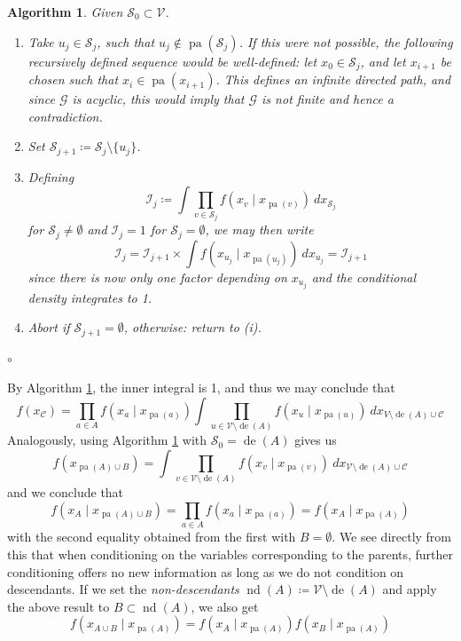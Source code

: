 \documentclass[11pt, a4paper]{memoir}
\theoremstyle{break}
\theoremstyle{break}
\newtheorem{inneralg}{Algorithm}
\newenvironment{alg}{\begin{inneralg}}{\ensuremath{\circ}\end{inneralg}}
\theoremstyle{nonumberplain}
\DeclareMathOperator{\pa}{pa}
\DeclareMathOperator{\de}{de}
\DeclareMathOperator{\nd}{nd}
\begin{document}
\begin{alg}\label{alg1}
Given $\mathcal{S}_0\subset \mathcal{V}$.
\begin{enumerate}[label=(\roman*)]
	\item Take $u_j\in \mathcal{S}_j$, such that $u_j\not\in \pa\left(\mathcal{S}_j\right)$. If this were not possible, the following recursively defined sequence would be well-defined: let $x_0\in \mathcal{S}_j$, and let $x_{i+1}$ be chosen such that $x_i\in \pa(x_{i+1})$. This defines an infinite directed path, and since $\mathcal{G}$ is acyclic, this would imply that $\mathcal{G}$ is not finite and hence a contradiction.
	\item Set $\mathcal{S}_{j+1}\coloneqq\mathcal{S}_j\setminus \{u_j\}$.  
	\item Defining
$$\mathcal{I}_{j}\coloneqq \int\prod_{v\in \mathcal{S}_j} f\left(x_v\mid x_{\pa(v)}\right)\ dx_{\mathcal{S}_j}$$
for $ \mathcal{S}_j\neq \emptyset$ and $\mathcal{I}_j=1$ for $\mathcal{S}_j= \emptyset$, we may then write
	$$\mathcal{I}_{j}=\mathcal{I}_{j+1}\times \int f\left(x_{u_j}\mid x_{\pa(u_j)}\right)\ dx_{u_j}=\mathcal{I}_{j+1}$$
	since there is now only one factor depending on $x_{u_j}$ and the conditional density integrates to 1.
	\item Abort if $\mathcal{S}_{j+1}=\emptyset$, otherwise: return to (i).
\end{enumerate}
\end{alg}
By Algorithm \ref{alg1}, the inner integral is 1, and thus we may conclude that
$$f(x_{\mathcal{C}})=\prod_{a\in A}f\left(x_a\mid x_{\pa(a)}\right)\int \prod_{u\in \mathcal{V}\setminus \de(A)} f\left(x_u\mid x_{\pa(u)}\right)\ dx_{V\setminus \de(A)\cup \mathcal{C}}$$
Analogously, using Algorithm \ref{alg1} with $\mathcal{S}_0=\de(A)$ gives us
$$
f(x_{\pa(A)\cup B})=\int \prod_{v\in \mathcal{V}\setminus\de(A)} f\left(x_v\mid x_{\pa(v)}\right)\ dx_{\mathcal{V}\setminus \de(A)\cup \mathcal{C}}
$$
and we conclude that
$$f\left(x_{A}\mid x_{\pa(A)\cup B}\right)=\prod_{a\in A} f\left(x_{a}\mid x_{\pa(a)}\right)=f\left(x_A\mid x_{\pa(A)}\right)$$
with the second equality obtained from the first with $B=\emptyset$. We see directly from this that when conditioning on the variables corresponding to the parents, further conditioning offers no new information as long as we do not condition on descendants. If we set the \textit{non-descendants} $\nd(A)\coloneqq\mathcal{V}\setminus \de(A)$ and apply the above result to $B\subset \nd(A)$, we also get
$$f\left(x_{A\cup B}\mid x_{\pa(A)}\right)=f\left(x_A\mid x_{\pa(A)}\right)f\left(x_{B}\mid x_{\pa(A)}\right)$$
\end{document}
